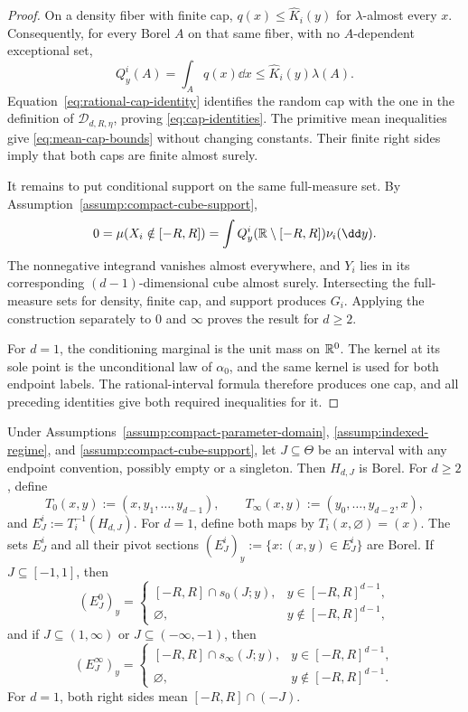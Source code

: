 \begin{proof}
On a density fiber with finite cap,
$q(x)\leq\widehat K_i(y)$ for $\lambda$-almost every $x$.  Consequently,
for every Borel $A$ on that same fiber, with no $A$-dependent exceptional
set,
\[
Q^i_y(A)=\int_Aq(x)\dd x
\leq\widehat K_i(y)\lambda(A).
\]
Equation~\eqref{eq:rational-cap-identity} identifies the random cap with the
one in the definition of $\mathcal D_{d,R,\eta}$, proving
\eqref{eq:cap-identities}.  The primitive mean inequalities give
\eqref{eq:mean-cap-bounds} without changing constants.  Their finite right
sides imply that both caps are finite almost surely.

It remains to put conditional support on the same full-measure set.  By
Assumption~\ref{assump:compact-cube-support},
\[
0=\mu(X_i\notin[-R,R])
=\int Q^i_y(\R\setminus[-R,R])\nu_i(\dd y).
\]
The nonnegative integrand vanishes almost everywhere, and $Y_i$ lies in its
corresponding $(d-1)$-dimensional cube almost surely.  Intersecting the
full-measure sets for density, finite cap, and support produces $G_i$.
Applying the construction separately to $0$ and $\infty$ proves the result
for $d\geq2$.

For $d=1$, the conditioning marginal is the unit mass on $\mathbb{R}^0$.  The kernel
at its sole point is the unconditional law of $\alpha_0$, and the same kernel
is used for both endpoint labels.  The rational-interval formula therefore
produces one cap, and all preceding identities give both required
inequalities for it.
\end{proof}

\begin{lemma}
\label{lem:borel-sections}
Under Assumptions~\ref{assump:compact-parameter-domain},
\ref{assump:indexed-regime}, and \ref{assump:compact-cube-support}, let
$J\subseteq\Theta$ be an interval with any endpoint convention, possibly
empty or a singleton.  Then $H_{d,J}$ is Borel.  For $d\geq2$, define
\[
T_0(x,y):=(x,y_1,\ldots,y_{d-1}),\qquad
T_\infty(x,y):=(y_0,\ldots,y_{d-2},x),
\]
and $E^i_J:=T_i^{-1}(H_{d,J})$.  For $d=1$, define both maps by
$T_i(x,\varnothing)=(x)$.  The sets $E^i_J$ and all their pivot sections
$(E^i_J)_y:=\{x:(x,y)\in E^i_J\}$ are Borel.  If $J\subseteq[-1,1]$, then
\begin{equation}
(E^0_J)_y=
\begin{cases}
[-R,R]\cap s_0(J;y),&y\in[-R,R]^{d-1},\\
\varnothing,&y\notin[-R,R]^{d-1},
\end{cases}
\label{eq:inner-section}
\end{equation}
and if $J\subseteq(1,\infty)$ or $J\subseteq(-\infty,-1)$, then
\begin{equation}
(E^\infty_J)_y=
\begin{cases}
[-R,R]\cap s_\infty(J;y),&y\in[-R,R]^{d-1},\\
\varnothing,&y\notin[-R,R]^{d-1}.
\end{cases}
\label{eq:outer-section}
\end{equation}
For $d=1$, both right sides mean $[-R,R]\cap(-J)$.
\end{lemma}

